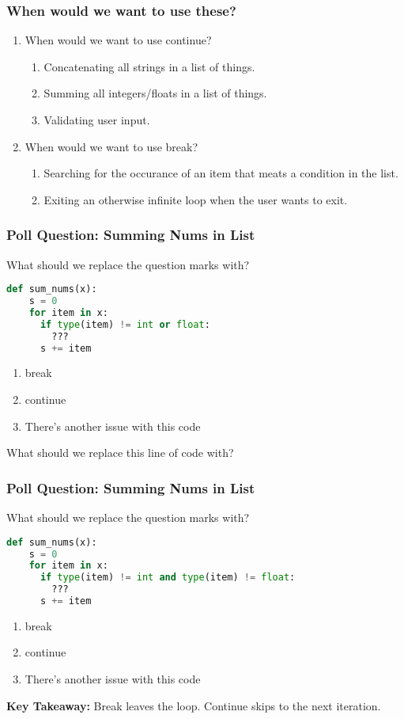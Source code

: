 \documentclass{beamer}
\begin{document}
%
%
\begin{frame}[fragile]
  \frametitle{When would we want to use these?}
  \begin{enumerate}
    \item When would we want to use continue?
      \pause
      \begin{enumerate}
        \item Concatenating all strings in a list of things.
        \item Summing all integers/floats in a list of things.
        \item Validating user input.
      \end{enumerate}
      \pause
    \item When would we want to use break?
      \pause
      \begin{enumerate}
        \item Searching for the occurance of an item that meats a condition in the list.
        \item Exiting an otherwise infinite loop when the user wants to exit.
      \end{enumerate}
  \end{enumerate}
\end{frame}

%
%
\begin{frame}[fragile]
  \frametitle{Poll Question: Summing Nums in List}
  What should we replace the question marks with?
  \begin{lstlisting}[language=Python, autogobble]
  def sum_nums(x):
    s = 0
    for item in x:
      if type(item) != int or float:
        ???
      s += item
  \end{lstlisting}
  \vfill
  \begin{enumerate}[A]
    \item break
    \item continue
    \item There's another issue with this code
  \end{enumerate}
  \pause
  \vfill
  What should we replace this line of code with?
\end{frame}

%
%
\begin{frame}[fragile]
  \frametitle{Poll Question: Summing Nums in List}
  What should we replace the question marks with?
  \begin{lstlisting}[language=Python, autogobble]
  def sum_nums(x):
    s = 0
    for item in x:
      if type(item) != int and type(item) != float:
        ???
      s += item
  \end{lstlisting}
  \vfill
  \begin{enumerate}[A]
    \item break
    \item continue
    \item There's another issue with this code
  \end{enumerate}
  \pause
  \vfill
  \textbf{Key Takeaway:} Break leaves the loop. Continue skips to the next iteration. 
\end{frame}
\end{document}
